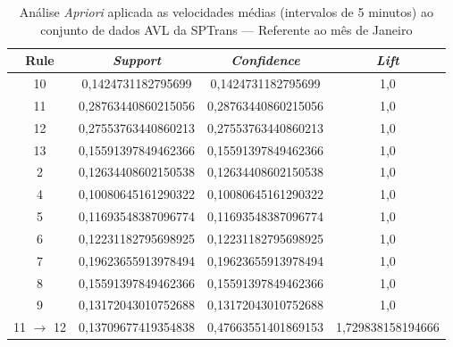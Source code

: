 \documentclass[
	12pt,				%
	oneside,			%
	a4paper,			%
	english,			%
	brazil				%
	]{abntex2ppgsi}
\begin{document}
\begin{apendicesenv}
\begin{table}[!htb]
\centering
\caption {Análise \textit{Apriori} aplicada as velocidades médias (intervalos de 5 minutos) ao conjunto de dados AVL da SPTrans --- Referente ao mês de Janeiro}
\label {tab:aprioriJanuary}
\begin{tabular}{c|c|c|c}
\hline
\textbf{Rule} & \textit{\textbf{Support}} & \textit{\textbf{Confidence}} & \textit{\textbf{Lift}} \\
\hline
10 &  0,1424731182795699 &  0,1424731182795699 &  1,0\\
\hline
11 &  0,28763440860215056 &  0,28763440860215056 &  1,0\\
\hline
12 &  0,27553763440860213 &  0,27553763440860213 &  1,0\\
\hline
13 &  0,15591397849462366 &  0,15591397849462366 &  1,0\\
\hline
2 &  0,12634408602150538 &  0,12634408602150538 &  1,0\\
\hline
4 &  0,10080645161290322 &  0,10080645161290322 &  1,0\\
\hline
5 &  0,11693548387096774 &  0,11693548387096774 &  1,0\\
\hline
6 &  0,12231182795698925 &  0,12231182795698925 &  1,0\\
\hline
7 &  0,19623655913978494 &  0,19623655913978494 &  1,0\\
\hline
8 &  0,15591397849462366 &  0,15591397849462366 &  1,0\\
\hline
9 &  0,13172043010752688 &  0,13172043010752688 &  1,0\\
\hline
11 $\rightarrow$ 12 &  0,13709677419354838 &  0,47663551401869153 &  1,729838158194666\\
\hline
\end{tabular}
\end{table}


\end{apendicesenv}
\end{document}
